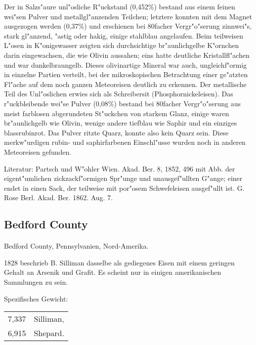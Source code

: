 \documentclass[a4paper, 11pt, oneside]{article}
\begin{document}
Der in Salzs"aure unl"osliche R"uckstand (0,452\%) bestand aus einem feinen wei"sen Pulver und metallgl"anzenden Teilchen; letztere konnten mit dem Magnet ausgezogen werden (0,37\%) und erschienen bei 80facher Vergr"o"serung zinnwei"s, stark gl"anzend, "astig oder hakig, einige stahlblau angelaufen. Beim teilweisen L"osen in K"onigswasser zeigten sich durchsichtige br"aunlichgelbe K"ornchen darin eingewachsen, die wie Olivin aussahen; eins hatte deutliche Kristallfl"achen und war dunkelbraungelb. Dieses olivinartige Mineral war auch, ungleichf"ormig in einzelne Partien verteilt, bei der mikroskopischen Betrachtung einer ge"atzten Fl"ache auf dem noch ganzen Meteoreisen deutlich zu erkennen. Der metallische Teil des Unl"oslichen erwies sich als Schreibersit (Phosphornickeleisen). Das r"uckbleibende wei"se Pulver (0,08\%) bestand bei 80facher Vergr"o"serung aus meist farblosen abgerundeten St"uckchen von starkem Glanz, einige waren br"aunlichgelb wie Olivin, wenige andere tiefblau wie Saphir und ein einziges blassrubinrot. Das Pulver ritzte Quarz, konnte also kein Quarz sein. Diese merkw"urdigen rubin- und saphirfarbenen Einschl"usse wurden noch in anderen Meteoreisen gefunden.

\footnotesize
Literatur: Partsch und W"ohler Wien. Akad. Ber. 8, 1852, 496 mit Abb. der eigent"umlichen zickzackf"ormigen Spr"unge und unausgef"ullten G"ange; einer endet in einen Sack, der teilweise mit por"osem Schwefeleisen ausgef"ullt ist. G. Rose Berl. Akad. Ber. 1862. Aug. 7.

\subsection{Bedford County}
\normalsize
\paragraph{}
Bedford County, Pennsylvanien, Nord-Amerika.

1828 beschrieb B. Silliman dasselbe als gediegenes Eisen mit einem geringen Gehalt an Arsenik und Grafit. Es scheint nur in einigen amerikanischen Sammlungen zu sein.

Spezifisches Gewicht:  
\begin{table}[!ht]
    \centering
    \begin{tabular}{l l}
        7,337 & Silliman,\\
        6,915 & Shepard.
    \end{tabular}
\end{table}
\end{document}
